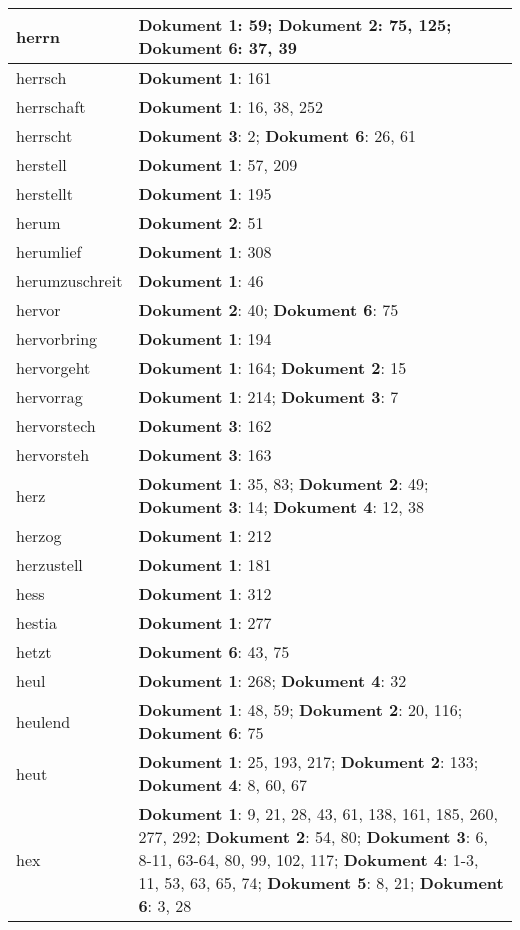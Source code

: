 \documentclass[a5paper]{article}
\begin{document}
\begin{longtable}[l]{|l|p{3in}|}
\hline
herrn & \textbf{Dokument 1}: 59; \textbf{Dokument 2}: 75, 125; \textbf{Dokument 6}: 37, 39 \\
\hline
herrsch & \textbf{Dokument 1}: 161 \\
\hline
herrschaft & \textbf{Dokument 1}: 16, 38, 252 \\
\hline
herrscht & \textbf{Dokument 3}: 2; \textbf{Dokument 6}: 26, 61 \\
\hline
herstell & \textbf{Dokument 1}: 57, 209 \\
\hline
herstellt & \textbf{Dokument 1}: 195 \\
\hline
herum & \textbf{Dokument 2}: 51 \\
\hline
herumlief & \textbf{Dokument 1}: 308 \\
\hline
herumzuschreit & \textbf{Dokument 1}: 46 \\
\hline
hervor & \textbf{Dokument 2}: 40; \textbf{Dokument 6}: 75 \\
\hline
hervorbring & \textbf{Dokument 1}: 194 \\
\hline
hervorgeht & \textbf{Dokument 1}: 164; \textbf{Dokument 2}: 15 \\
\hline
hervorrag & \textbf{Dokument 1}: 214; \textbf{Dokument 3}: 7 \\
\hline
hervorstech & \textbf{Dokument 3}: 162 \\
\hline
hervorsteh & \textbf{Dokument 3}: 163 \\
\hline
herz & \textbf{Dokument 1}: 35, 83; \textbf{Dokument 2}: 49; \textbf{Dokument 3}: 14; \textbf{Dokument 4}: 12, 38 \\
\hline
herzog & \textbf{Dokument 1}: 212 \\
\hline
herzustell & \textbf{Dokument 1}: 181 \\
\hline
hess & \textbf{Dokument 1}: 312 \\
\hline
hestia & \textbf{Dokument 1}: 277 \\
\hline
hetzt & \textbf{Dokument 6}: 43, 75 \\
\hline
heul & \textbf{Dokument 1}: 268; \textbf{Dokument 4}: 32 \\
\hline
heulend & \textbf{Dokument 1}: 48, 59; \textbf{Dokument 2}: 20, 116; \textbf{Dokument 6}: 75 \\
\hline
heut & \textbf{Dokument 1}: 25, 193, 217; \textbf{Dokument 2}: 133; \textbf{Dokument 4}: 8, 60, 67 \\
\hline
hex & \textbf{Dokument 1}: 9, 21, 28, 43, 61, 138, 161, 185, 260, 277, 292; \textbf{Dokument 2}: 54, 80; \textbf{Dokument 3}: 6, 8-11, 63-64, 80, 99, 102, 117; \textbf{Dokument 4}: 1-3, 11, 53, 63, 65, 74; \textbf{Dokument 5}: 8, 21; \textbf{Dokument 6}: 3, 28 \\

\end{longtable}
\end{document}

